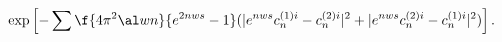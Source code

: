 \begin{equation}
\exp \left[-\sum\f{4\pi^2\al wn}{e^{2nws}-1}
(|e^{nws}c^{(1)i}_{n}-c^{(2)i}_{n}|^2
+|e^{nws}c^{(2)i}_{n}-c^{(1)i}_{n}|^2)\right].
\end{equation}

